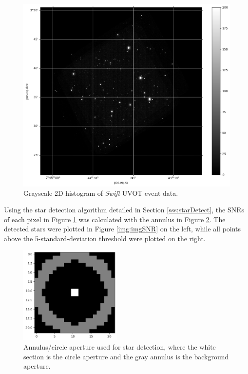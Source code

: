 \documentclass{article}
\begin{document}
\begin{figure}[h]
    \centering
    \includegraphics[width=\textwidth]{example2DHist.png}
    \caption{Grayscale 2D histogram of \textit{Swift} UVOT event data.}
    \label{img:2DHist}
\end{figure}

\begin{multicols}{2}

Using the star detection algorithm detailed in Section \ref{sss:starDetect}, the SNRs of each pixel in Figure \ref{img:2DHist} was calculated with the annulus in Figure \ref{img:annulus}. The detected stars were plotted in Figure \ref{img:imgSNR} on the left, while all points above the 5-standard-deviation threshold were plotted on the right.

\end{multicols}

\begin{figure}[h]
    \centering
    \includegraphics[width=2in]{annulus_png.png}
    \caption{Annulus/circle aperture used for star detection, where the white section is the circle aperture and the gray annulus is the background aperture.}
    \label{img:annulus}
\end{figure}
\end{document}
